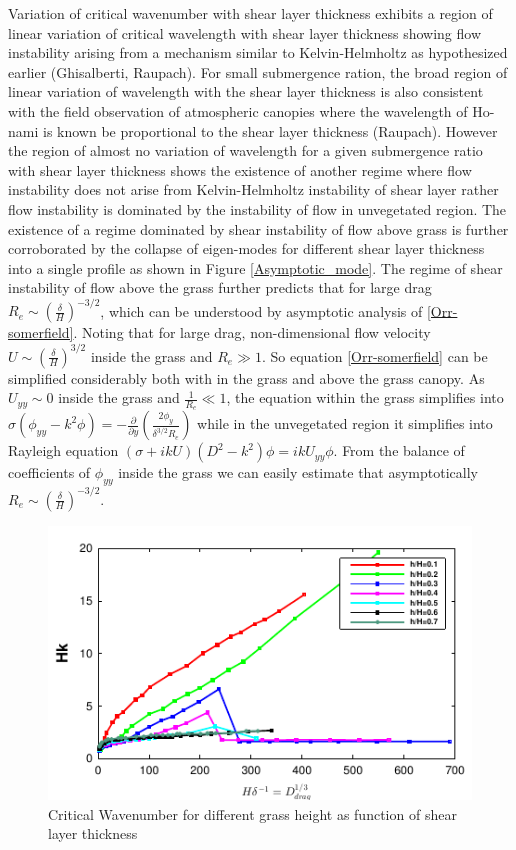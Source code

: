 \documentclass[aps,twocolumn,floatfix,prl,10pt]{revtex4-1}
\newcommand{\del}{\partial}
\begin{document}
\newline
Variation of critical wavenumber with shear layer thickness exhibits a region of linear variation of critical wavelength with shear layer thickness showing flow instability arising from
a mechanism similar to Kelvin-Helmholtz as hypothesized earlier (Ghisalberti, Raupach). For small submergence ration, the broad region of linear variation of wavelength 
with the shear layer thickness is also consistent with the field observation of atmospheric canopies where the wavelength of Ho-nami is known be proportional to the
shear layer thickness (Raupach). However the region of almost no variation of wavelength for a given submergence ratio with shear layer thickness shows the existence of another regime 
where flow instability does not arise from Kelvin-Helmholtz instability of shear layer rather flow instability is dominated by
the instability of flow in unvegetated region. The existence of a regime dominated by shear instability of flow above grass is further corroborated by the collapse of eigen-modes 
for different shear layer thickness into a single profile as shown in Figure \ref{Asymptotic_mode}. The regime of shear instability of flow above the grass further predicts that for
large drag $R_e \sim (\frac{\delta}{H})^{-3/2}$, which can be understood by asymptotic analysis of \eqref{Orr-somerfield}.
Noting that for large drag, non-dimensional flow velocity $U \sim (\frac{\delta}{H})^{3/2}$ inside the grass and $R_{e} \gg 1$. So equation \eqref{Orr-somerfield}
can be simplified considerably both with in the grass and above the grass canopy. As $U_{yy}\sim 0$ inside the grass and $\frac{1}{R_e} \ll 1$,
the equation within the grass simplifies into
$\sigma\left(\phi_{yy}-k^2\phi\right) = -\frac{\del}{\del y}\left(\frac{2\phi_y}{\delta^{3/2}R_e}\right)$ while in the unvegetated region it simplifies into Rayleigh equation 
$ \left(\sigma+ikU\right) \left(D^2-k^2\right)\phi =  ikU_{yy}\phi$. From the balance of coefficients of $\phi_{yy}$ inside the grass we can easily estimate that asymptotically 
$R_e \sim (\frac{\delta}{H})^{-3/2}$.  
\begin{figure}[htb]
\includegraphics[]{K_vs_shear_width}
\caption{Critical Wavenumber for different grass height as function of shear layer thickness}
\label{K_vs_shear}
\end{figure}
\end{document}
